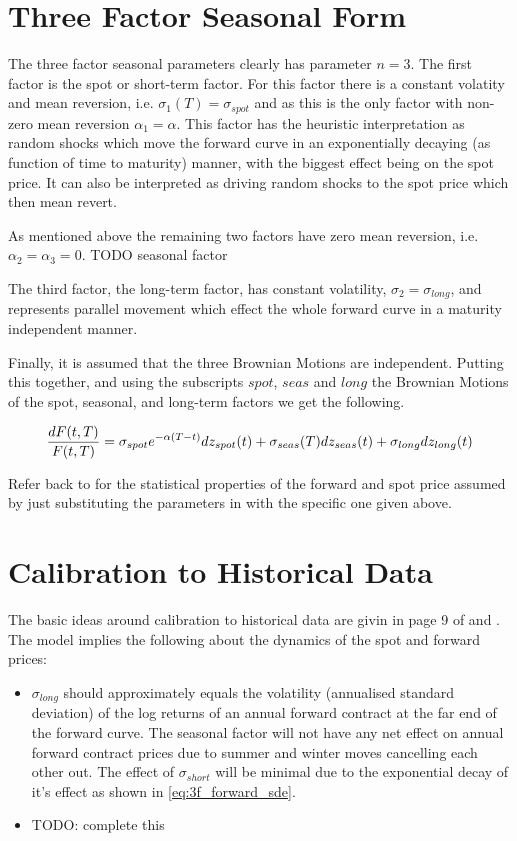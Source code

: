 \documentclass{article}
\begin{document}
\section{Three Factor Seasonal Form}
The three factor seasonal parameters clearly has parameter $n=3$. The first factor is
the spot or short-term factor. For this factor there is a constant volatity and mean
reversion, i.e. $\sigma_1(T) = \sigma_{spot}$ and as this is the only factor with
non-zero mean reversion $\alpha_1 = \alpha$. This factor has the heuristic interpretation
as random shocks which move the forward curve in an exponentially decaying (as function of
time to maturity) manner, with the biggest effect being on the spot price. It can also %
be interpreted as driving random shocks to the spot price which then mean revert.

As mentioned above the remaining two factors have zero mean reversion, i.e. 
$\alpha_2 = \alpha_3 = 0$. TODO seasonal factor 

The third factor, the long-term factor, has constant volatility, $\sigma_2 = \sigma_{long}$,
and represents parallel movement which effect the whole forward curve in a maturity 
independent manner.

Finally, it is assumed that the three Brownian Motions are independent. Putting this 
together, and using the subscripts $spot$, $seas$ and $long$ the Brownian Motions
of the spot, seasonal, and long-term factors we get the following.

\begin{equation}
    \label{eq:3f_forward_sde}
    \frac{dF(t, T)}{F(t, T)}= \sigma_{spot} e^{-\alpha(T - t)} dz_{spot}(t) + \\
        \sigma_{seas}(T) dz_{seas}(t) + \sigma_{long} dz_{long}(t)
\end{equation}

Refer back to \cite{Fowler} for the statistical properties of the forward and spot
price assumed by just substituting the parameters in \cite{Fowler} with the specific
one given above.

\section{Calibration to Historical Data}
The basic ideas around calibration to historical data are givin in page 9 of \cite{Boogert}
and \cite{deJong}. The model implies the following about the dynamics of the spot and forward
prices:
\begin{itemize}
    \item $\sigma_{long}$ should approximately equals the volatility (annualised standard 
    deviation) of the log returns of an annual forward contract at the far end of the 
    forward curve. The seasonal factor will not have any net effect on annual forward 
    contract prices due to summer and winter moves cancelling each other out. The effect
    of $\sigma_{short}$ will be minimal due to the exponential decay of it's effect as
    shown in \ref{eq:3f_forward_sde}.
    \item TODO: complete this
\end{itemize}
\end{document}
